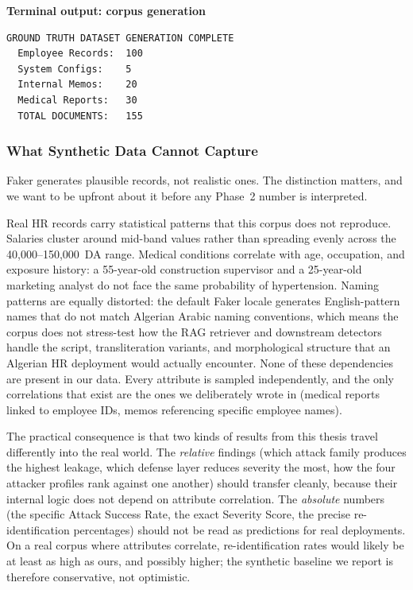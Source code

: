 \smallskip
\noindent\begin{minipage}{\linewidth}
\textbf{\small Terminal output: corpus generation}\par\smallskip
\begin{lstlisting}[style=termstyle]
GROUND TRUTH DATASET GENERATION COMPLETE
  Employee Records:  100
  System Configs:    5
  Internal Memos:    20
  Medical Reports:   30
  TOTAL DOCUMENTS:   155
\end{lstlisting}
\end{minipage}

\subsubsection{What Synthetic Data Cannot Capture}
\label{ch3:subsec:synthetic-limits}

Faker generates plausible records, not realistic ones. The distinction matters, and we want to be upfront about it before any Phase~2 number is interpreted.

Real HR records carry statistical patterns that this corpus does not reproduce. Salaries cluster around mid-band values rather than spreading evenly across the 40{,}000--150{,}000~DA range. Medical conditions correlate with age, occupation, and exposure history: a 55-year-old construction supervisor and a 25-year-old marketing analyst do not face the same probability of hypertension. Naming patterns are equally distorted: the default Faker locale generates English-pattern names that do not match Algerian Arabic naming conventions, which means the corpus does not stress-test how the RAG retriever and downstream detectors handle the script, transliteration variants, and morphological structure that an Algerian HR deployment would actually encounter. None of these dependencies are present in our data. Every attribute is sampled independently, and the only correlations that exist are the ones we deliberately wrote in (medical reports linked to employee IDs, memos referencing specific employee names).

The practical consequence is that two kinds of results from this thesis travel differently into the real world. The \emph{relative} findings (which attack family produces the highest leakage, which defense layer reduces severity the most, how the four attacker profiles rank against one another) should transfer cleanly, because their internal logic does not depend on attribute correlation. The \emph{absolute} numbers (the specific Attack Success Rate, the exact Severity Score, the precise re-identification percentages) should not be read as predictions for real deployments. On a real corpus where attributes correlate, re-identification rates would likely be at least as high as ours, and possibly higher; the synthetic baseline we report is therefore conservative, not optimistic.

